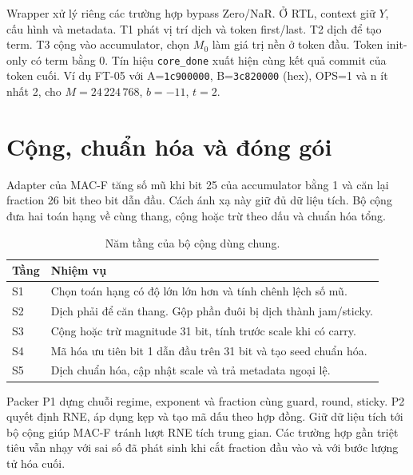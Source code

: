 \begin{samepage}
Wrapper xử lý riêng các trường hợp bypass Zero/NaR.
Ở RTL, context giữ $Y$, cấu hình và metadata. T1 phát vị trí dịch và token
first/last. T2 dịch để tạo term. T3 cộng vào accumulator, chọn $M_0$ làm
giá trị nền ở token đầu. Token init-only có term bằng 0. Tín hiệu
\texttt{core\_done} xuất hiện cùng kết quả commit của token cuối.
Ví dụ FT-05 với A=\texttt{1c900000}, B=\texttt{3c820000} (hex),
OPS=1 và n ít nhất 2, cho $M=24\,224\,768$, $b=-11$, $t=2$.
\par\end{samepage}



\section{Cộng, chuẩn hóa và đóng gói}
Adapter của MAC-F tăng số mũ khi bit 25 của accumulator bằng 1 và
căn lại fraction 26 bit theo bit dẫn đầu. Cách ánh xạ này giữ đủ dữ liệu
tích. Bộ cộng đưa hai toán hạng về cùng thang, cộng hoặc trừ theo dấu và
chuẩn hóa tổng.

\begin{table}[!htbp]
  \centering
  \caption{Năm tầng của bộ cộng dùng chung.}
  \label{tab:adder-stages}
  \begin{tabular}{lp{}}
    \hline
    Tầng & Nhiệm vụ \\
    \hline
    S1 & Chọn toán hạng có độ lớn lớn hơn và tính chênh lệch số mũ. \\
    S2 & Dịch phải để căn thang. Gộp phần đuôi bị dịch thành jam/sticky. \\
    S3 & Cộng hoặc trừ magnitude 31 bit, tính trước scale khi có carry. \\
    S4 & Mã hóa ưu tiên bit 1 dẫn đầu trên 31 bit và tạo seed chuẩn hóa. \\
    S5 & Dịch chuẩn hóa, cập nhật scale và trả metadata ngoại lệ. \\
    \hline
  \end{tabular}
\end{table}

Packer P1 dựng chuỗi regime, exponent và fraction cùng guard, round,
sticky. P2 quyết định RNE, áp dụng kẹp và tạo mã dấu theo hợp đồng.
Giữ dữ liệu tích tới bộ cộng giúp MAC-F tránh lượt RNE tích trung gian.
Các trường hợp gần triệt tiêu vẫn nhạy với sai số đã phát sinh khi cắt
fraction đầu vào và với bước lượng tử hóa cuối.


